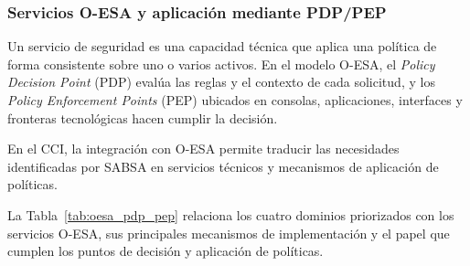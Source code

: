 \subsubsection{Servicios O-ESA y aplicación mediante PDP/PEP}

Un servicio de seguridad es una capacidad técnica que aplica una política de forma consistente sobre uno o varios activos. En el modelo O-ESA, el \textit{Policy Decision Point} (PDP) evalúa las reglas y el contexto de cada solicitud, y los \textit{Policy Enforcement Points} (PEP) ubicados en consolas, aplicaciones, interfaces y fronteras tecnológicas hacen cumplir la decisión.

En el CCI, la integración con O-ESA \parencite{oesa2011,oesaCCI2026} permite traducir las necesidades identificadas por SABSA en servicios técnicos y mecanismos de aplicación de políticas.

La Tabla~\ref{tab:oesa_pdp_pep} relaciona los cuatro dominios priorizados con los servicios
O-ESA, sus principales mecanismos de implementación y el papel que cumplen los puntos de
decisión y aplicación de políticas.

